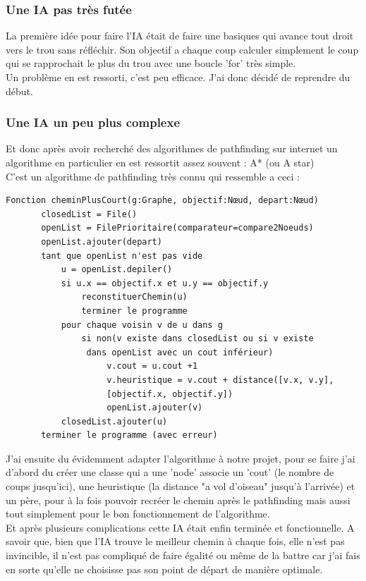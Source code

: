 \documentclass{article}
\begin{document}
\subsubsection{Une IA pas très futée}
La première idée pour faire l'IA était de faire une basiques qui avance tout droit vers le trou sans réfléchir. Son objectif a chaque coup calculer simplement le coup qui se rapprochait le plus du trou avec une boucle 'for' très simple.\\
Un problème en est ressorti, c'est peu efficace. J'ai donc décidé de reprendre du début.\\
\subsubsection{Une IA un peu plus complexe}
Et donc après avoir recherché des algorithmes de pathfinding sur internet un algorithme en particulier en est ressortit assez souvent : A* (ou A star)\\
C'est un algorithme de pathfinding très connu qui ressemble a ceci :
\begin{verbatim}
Fonction cheminPlusCourt(g:Graphe, objectif:Nœud, depart:Nœud)
       closedList = File()
       openList = FilePrioritaire(comparateur=compare2Noeuds)
       openList.ajouter(depart)
       tant que openList n'est pas vide
           u = openList.depiler()
           si u.x == objectif.x et u.y == objectif.y
               reconstituerChemin(u)
               terminer le programme
           pour chaque voisin v de u dans g
               si non(v existe dans closedList ou si v existe
                dans openList avec un cout inférieur)
                    v.cout = u.cout +1 
                    v.heuristique = v.cout + distance([v.x, v.y], 
                    [objectif.x, objectif.y])
                    openList.ajouter(v)
           closedList.ajouter(u)
       terminer le programme (avec erreur)
\end{verbatim}
J'ai ensuite du évidemment adapter l'algorithme à notre projet, pour se faire j'ai d'abord du créer une classe qui a une 'node' associe un 'cout' (le nombre de coups jusqu'ici), une heuristique (la distance "a vol d'oiseau" jusqu'à l'arrivée) et un père, pour à la fois pouvoir recréer le chemin après le pathfinding mais aussi tout simplement pour le bon fonctionnement de l'algorithme. \\
Et après plusieurs complications cette IA était enfin terminée et fonctionnelle. A savoir que, bien que l'IA trouve le meilleur chemin à chaque fois, elle n'est pas invincible, il n'est pas compliqué de faire égalité ou même de la battre car j'ai fais en sorte qu'elle ne choisisse pas son point de départ de manière optimale.
\newpage
\end{document}
